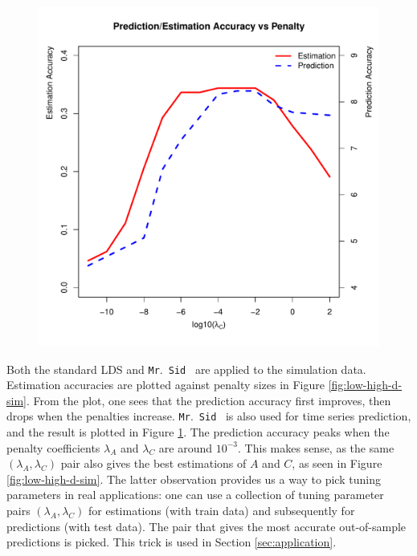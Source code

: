 \documentclass[times,twocolumn,final,authoryear]{elsarticle}
\newcommand{\mrsid}{{\sc \texttt{Mr}.~\texttt{Sid}}}
\let\oldref\ref
\renewcommand{\ref}[1]{(\oldref{#1})}
\begin{document}
\begin{figure}
\centering
\includegraphics[scale=0.46]{../figures/est-pred-accuracy.pdf}

\label{fig:estpredaccuracy}
\end{figure}

Both the standard LDS and \mrsid~  are applied to the simulation data. Estimation accuracies are plotted against penalty sizes in Figure \oldref{fig:low-high-d-sim}. From the plot, one sees that the prediction accuracy first improves, then drops when the penalties increase. \mrsid~  is also used for time series prediction, and the result is plotted in Figure \oldref{fig:estpredaccuracy}. The prediction accuracy peaks when the penalty coefficients $\lambda_A$ and $\lambda_C$ are around $10^{-3}$. This makes sense, as the same $(\lambda_A,\lambda_C)$ pair also gives the best estimations of $A$ and $C$, as seen in Figure \oldref{fig:low-high-d-sim}. The latter observation provides us a way to pick tuning parameters in real applications: one can use a collection of tuning parameter pairs $(\lambda_A,\lambda_C)$ for estimations (with train data) and subsequently for predictions (with test data). The pair that gives the most accurate out-of-sample predictions is picked. This trick is used in Section \oldref{sec:application}.
\end{document}

